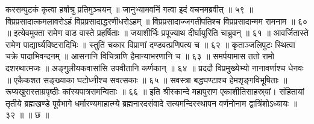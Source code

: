 करसम्पुटकं कृत्वा हर्षाश्रु प्रतिमुञ्चयन् ॥
जानुभ्यामवनिं गत्वा इदं वचनमब्रवीत् ॥ ५९ ॥
विप्रप्रसादात्कमलावरोऽहं विप्रप्रसादाद्धरणीधरोऽहम् ॥
विप्रप्रसादाज्जगतीपतिश्च विप्रप्रसादान्मम रामनाम ॥ ६० ॥
इत्येवमुक्ता रामेण वाड वास्ते प्रहर्षिताः ॥
जयाशीर्भिः प्रपूज्याथ दीर्घायुरिति चाब्रुवन् ॥ ६१ ॥
आवर्जितास्ते रामेण पाद्यार्घ्यविष्टरादिभिः ॥
स्तुतिं चकार विप्राणां दण्डवत्प्रणिपत्य च ॥ ६२ ॥
कृताञ्जलिपुटः स्थित्वा चक्रे पादाभिवन्दनम् ॥
आसनानि विचित्राणि हैमान्याभरणानि च ॥ ६३ ॥
समर्पयामास ततो रामो दशरथात्मजः ॥
अङ्गुलीयकवासांसि उपवीतानि कर्णकान् ॥ ६४ ॥
प्रददौ विप्रमुख्येभ्यो नानावर्णाश्च धेनवः ॥
एकैकशत सङ्ख्याका घटोध्नीश्च सवत्सकाः ॥ ६५ ॥
सवस्त्रा बद्धघण्टाश्च हेमशृङ्गविभूषिताः ॥
रूप्यखुरास्ताम्रपृष्ठीः कांस्यपात्रसमन्विताः ॥ ६६ ॥
इति श्रीस्कान्दे महापुराण एकाशीतिसाहस्र्यां। संहितायां तृतीये ब्रह्मखण्डे पूर्वभागे धर्मारण्यमाहात्म्ये ब्रह्मनारदसंवादे सत्यमन्दिरस्थापन वर्णनोनाम द्वात्रिंशोऽध्यायः ॥ ३२ ॥ ॥ छ ॥

